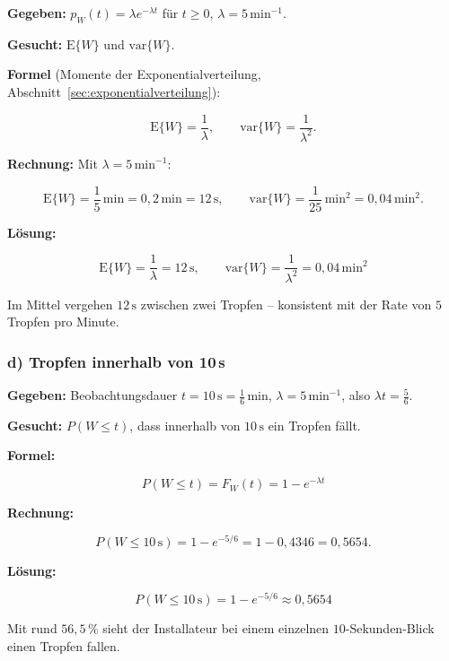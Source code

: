 \begin{beispiel}

\textbf{Gegeben:} $p_W(t) = \lambda e^{-\lambda t}$ für $t \geq 0$,
$\lambda = 5\,\mathrm{min}^{-1}$.

\textbf{Gesucht:} $\mathrm{E}\{W\}$ und $\mathrm{var}\{W\}$.

\textbf{Formel} (Momente der Exponentialverteilung,
Abschnitt~\ref{sec:exponentialverteilung}):

$$
\mathrm{E}\{W\} = \frac{1}{\lambda}, \qquad \mathrm{var}\{W\} = \frac{1}{\lambda^2}.
$$

\textbf{Rechnung:} Mit $\lambda = 5\,\mathrm{min}^{-1}$:

$$
\mathrm{E}\{W\} = \frac{1}{5}\,\mathrm{min} = 0{,}2\,\mathrm{min} = 12\,\mathrm{s},
\qquad
\mathrm{var}\{W\} = \frac{1}{25}\,\mathrm{min}^2 = 0{,}04\,\mathrm{min}^2.
$$

\textbf{Lösung:}

$$
\boxed{\;\mathrm{E}\{W\} = \frac{1}{\lambda} = 12\,\mathrm{s}, \qquad
\mathrm{var}\{W\} = \frac{1}{\lambda^2} = 0{,}04\,\mathrm{min}^2\;}
$$

Im Mittel vergehen $12\,\mathrm{s}$ zwischen zwei Tropfen -- konsistent mit der
Rate von $5$ Tropfen pro Minute.

\end{beispiel}

\subsubsection*{d) Tropfen innerhalb von 10\,s}

\begin{beispiel}

\textbf{Gegeben:} Beobachtungsdauer $t = 10\,\mathrm{s} = \tfrac{1}{6}\,\mathrm{min}$,
$\lambda = 5\,\mathrm{min}^{-1}$, also $\lambda t = \tfrac{5}{6}$.

\textbf{Gesucht:} $P(W \leq t)$, dass innerhalb von $10\,\mathrm{s}$ ein Tropfen
fällt.

\textbf{Formel:}

$$
P(W \leq t) = F_W(t) = 1 - e^{-\lambda t}
$$

\textbf{Rechnung:}

$$
P(W \leq 10\,\mathrm{s}) = 1 - e^{-5/6} = 1 - 0{,}4346 = 0{,}5654.
$$

\textbf{Lösung:}

$$
\boxed{\;P(W \leq 10\,\mathrm{s}) = 1 - e^{-5/6} \approx 0{,}5654\;}
$$

Mit rund $56{,}5\,\%$ sieht der Installateur bei einem einzelnen $10$-Sekunden-Blick
einen Tropfen fallen.

\end{beispiel}

